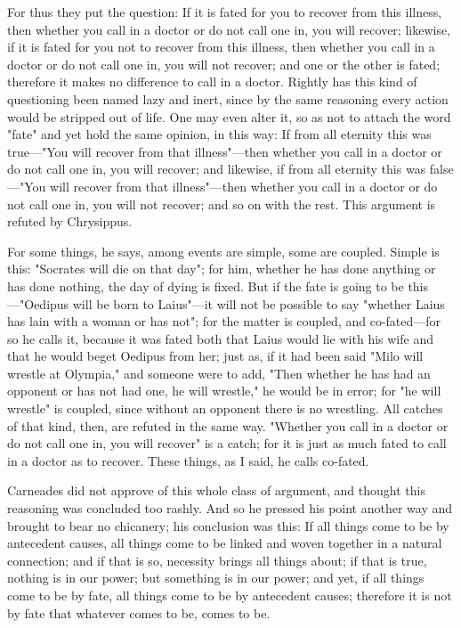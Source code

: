  For thus they put the question: If it is fated for you to recover from this illness, then whether you call in a doctor or do not call one in, you will recover; likewise, if it is fated for you not to recover from this illness, then whether you call in a doctor or do not call one in, you will not recover; and one or the other is fated; therefore it makes no difference to call in a doctor. Rightly has this kind of questioning been named lazy and inert, since by the same reasoning every action would be stripped out of life. One may even alter it, so as not to attach the word "fate" and yet hold the same opinion, in this way: If from all eternity this was true—"You will recover from that illness"—then whether you call in a doctor or do not call one in, you will recover; and likewise, if from all eternity this was false—"You will recover from that illness"—then whether you call in a doctor or do not call one in, you will not recover; and so on with the rest. This argument is refuted by Chrysippus.

 For some things, he says, among events are simple, some are coupled. Simple is this: "Socrates will die on that day"; for him, whether he has done anything or has done nothing, the day of dying is fixed. But if the fate is going to be this—"Oedipus will be born to Laius"—it will not be possible to say "whether Laius has lain with a woman or has not"; for the matter is coupled, and co-fated—for so he calls it, because it was fated both that Laius would lie with his wife and that he would beget Oedipus from her; just as, if it had been said "Milo will wrestle at Olympia," and someone were to add, "Then whether he has had an opponent or has not had one, he will wrestle," he would be in error; for "he will wrestle" is coupled, since without an opponent there is no wrestling. All catches of that kind, then, are refuted in the same way. "Whether you call in a doctor or do not call one in, you will recover" is a catch; for it is just as much fated to call in a doctor as to recover. These things, as I said, he calls co-fated.

 Carneades did not approve of this whole class of argument, and thought this reasoning was concluded too rashly. And so he pressed his point another way and brought to bear no chicanery; his conclusion was this: If all things come to be by antecedent causes, all things come to be linked and woven together in a natural connection; and if that is so, necessity brings all things about; if that is true, nothing is in our power; but something is in our power; and yet, if all things come to be by fate, all things come to be by antecedent causes; therefore it is not by fate that whatever comes to be, comes to be.

